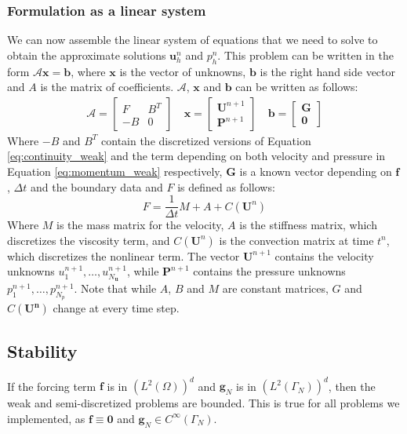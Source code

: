 \subsubsection{Formulation as a linear system}
We can now assemble the linear system of equations that we need to solve to obtain the approximate solutions $\mathbf{u}^n_h$ and $p^n_h$.
This problem can be written in the form $\mathcal{A} \mathbf{x} = \mathbf{b}$, where $\mathbf{x}$ is the vector of unknowns, $\mathbf{b}$ is the right hand side vector and $A$ is the matrix of coefficients. $\mathcal{A}$, $\mathbf{x}$ and $\mathbf{b}$ can be written as follows:
$$
\begin{matrix}
    \mathcal{A} = \begin{bmatrix}
        F & B^T \\
        -B & 0
    \end{bmatrix} \quad
    \mathbf{x} = \begin{bmatrix}
        \mathbf{U}^{n+1} \\
        \mathbf{P}^{n+1}
    \end{bmatrix} \quad
    \mathbf{b} = \begin{bmatrix}
        \mathbf{G} \\
        \mathbf{0}
    \end{bmatrix}
\end{matrix}
$$
Where $-B$ and $B^T$ contain the discretized versions of Equation \ref{eq:continuity_weak} and the term depending on both velocity and pressure in Equation \ref{eq:momentum_weak} respectively, $\mathbf{G}$ is a known vector depending on $\mathbf{f}$, $\Delta t$ and the boundary data and $F$ is defined as follows:
\begin{equation}
    F = \frac{1}{\Delta t} M + A + C(\mathbf{U}^n)
\end{equation}
Where $M$ is the mass matrix for the velocity, $A$ is the stiffness matrix, which discretizes the viscosity term, and $C(\mathbf{U}^n)$ is the convection matrix at time $t^n$, which discretizes the nonlinear term. The vector $\mathbf{U}^{n+1}$ contains the velocity unknowns $u_1^{n+1}, \dots, u_{N_{\mathbf{u}}}^{n+1}$, while $\mathbf{P}^{n+1}$ contains the pressure unknowns $p_1^{n+1}, \dots, p_{N_p}^{n+1}$. Note that while $A$, $B$ and $M$ are constant matrices, $G$ and $C(\mathbf{U^n})$ change at every time step.

\subsection{Stability}
If the forcing term $\mathbf{f}$ is in $(L^2(\Omega))^d$ and $\mathbf{g}_N$ is in $(L^2(\Gamma_N))^d$, then the weak and semi-discretized problems are bounded. This is true for all problems we implemented, as $\mathbf{f} \equiv \mathbf{0}$ and $\mathbf{g}_N \in C^\infty(\Gamma_N)$.


